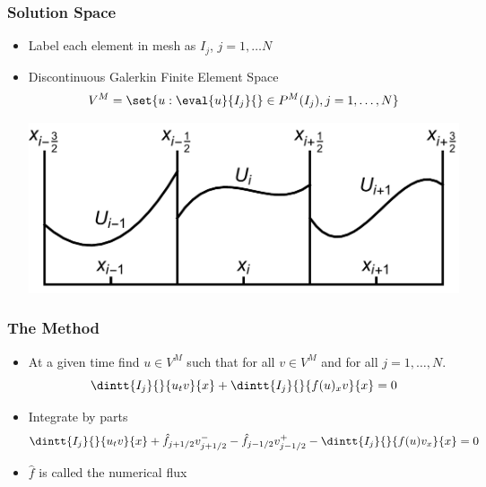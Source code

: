 \documentclass[10pt]{beamer}
\begin{document}
  \begin{frame}
    \frametitle{Solution Space}
    \begin{itemize}
      \item Label each element in mesh as $I_j$, $j = 1, \ldots N$
      \item Discontinuous Galerkin Finite Element Space
        \[
          V^M = \set{u: \eval{u}{I_j}{} \in P^M(I_j), j = 1, \ldots, N}
        \]

        \includegraphics[scale=0.35]{Figures/DG.pdf}
    \end{itemize}
  \end{frame}

  \begin{frame}
    \frametitle{The Method}
    \begin{itemize}
      \item At a given time find $u \in V^M$ such that for all $v \in V^M$ and for all $j = 1, \ldots, N$.
        \[
          \dintt{I_j}{}{u_t v}{x} + \dintt{I_j}{}{f(u)_x v}{x} = 0
        \]

      \item Integrate by parts
        \[
          \dintt{I_j}{}{u_t v}{x} + \hat{f}_{j+1/2} v^-_{j+1/2} - \hat{f}_{j-1/2} v^+_{j-1/2} - \dintt{I_j}{}{f(u) v_x}{x} = 0
        \]

      \item $\hat{f}$ is called the numerical flux
    \end{itemize}
  \end{frame}
\end{document}
